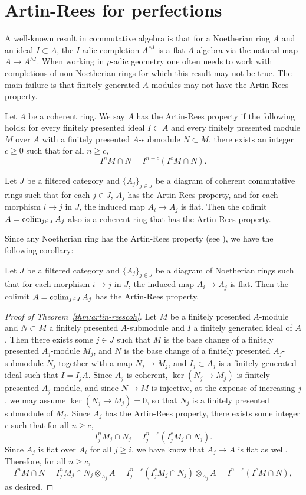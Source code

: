 \section{Artin-Rees for perfections}
A well-known result in commutative algebra is that for a Noetherian ring $A$ and an ideal $I \subset A$, the 
$I$-adic completion $A^{\wedge I}$ is a flat $A$-algebra via the natural map $A \to A^{\wedge I}$. 
When working in $p$-adic geometry one often needs to work with completions of non-Noetherian rings for which this result may not be true.
The main failure is that finitely generated $A$-modules may not have the Artin-Rees property.
\begin{definition}\label{def:artin-rees}
Let $A$ be a coherent ring. We say $A$ has the Artin-Rees property if the following holds: for every finitely presented ideal $I \subset A$ and 
every finitely presented module $M$ over $A$ with a finitely presented $A$-submodule $N \subset M$, there exists an integer $c \ge 0$ such that for all $n \ge c$,
\[
I^n M \cap N = I^{n-c}(I^c M \cap N).
\]
\end{definition}
\begin{theorem}\label{thm:artin-reescoh}
Let $J$ be a filtered category and $\{A_j\}_{j \in J}$ be a diagram of coherent commutative rings such that for each $j \in J$, $A_j$ has the Artin-Rees property, 
and for each morphism $i \to j$ in $J$, the induced map $A_i \to A_j$ is flat. 
Then the colimit $A = \operatorname*{colim}_{j \in J} A_j$ also is a coherent ring that has the Artin-Rees property.
\end{theorem}
Since any Noetherian ring has the Artin-Rees property (see \cite[00IN]{sp}), we have the following corollary:
\begin{corollary}\label{cor:artin-rees}
Let $J$ be a filtered category and $\{A_j\}_{j \in J}$ be a diagram of Noetherian rings such that for each morphism $i \to j$ in $J$, the induced map $A_i \to A_j$ is flat.
Then the colimit $A = \operatorname*{colim}_{j \in J} A_j$ has the Artin-Rees property.
\end{corollary}
\begin{proof}[Proof of Theorem~\ref{thm:artin-reescoh}]
Let $M$ be a finitely presented $A$-module and $N \subset M$ a finitely presented $A$-submodule and $I$ a finitely generated ideal of $A$. 
Then there exists some $j \in J$ such that $M$ is the base change of a finitely presented $A_j$-module $M_j$, 
and $N$ is the base change of a finitely presented $A_j$-submodule $N_j$ together with a map $N_j \to M_j$, and $I_{j} \subset A_j$ is a finitely generated ideal such that $I = I_j A$.
Since $A_j$ is coherent, $\ker(N_j \to M_j)$ is finitely presented $A_j$-module, and since $N \to M$ is injective, at the expense of increasing $j$, we may assume $\ker(N_j \to M_j) = 0$, so that $N_j$
is a finitely presented submodule of $M_j$. Since $A_j$ has the Artin-Rees property, there exists some integer $c$ such that for all $n \ge c$,
\[I_j^n M_j \cap N_j = I_j^{n-c}(I_j^c M_j \cap N_j).\]
Since $A_j$ is flat over $A_i$ for all $j \ge i$, we have know that $A_j \to A$ is flat as well. Therefore, for all $n \ge c$,
\[I^n M \cap N = I_j^n M_j \cap N_j \otimes_{A_j} A = I_j^{n-c}(I_j^c M_j \cap N_j) \otimes_{A_j} A = I^{n-c}(I^c M \cap N),\]
as desired.
\end{proof}
